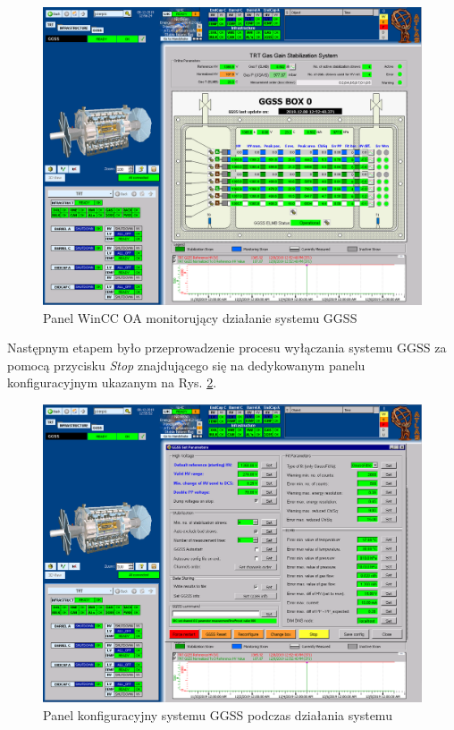 \begin{figure}[H]
\centering
\caption{Panel WinCC OA monitorujący działanie systemu GGSS}
\label{fig:ggss}
\includegraphics[width=\textwidth]{res/png/ggssStraw}
\end{figure}

Następnym etapem było przeprowadzenie procesu wyłączania systemu GGSS za pomocą przycisku \textit{Stop} znajdującego się na dedykowanym panelu konfiguracyjnym ukazanym na Rys. \ref{fig:ggsspanel}. 

\begin{figure}
\centering
\caption{Panel konfiguracyjny systemu GGSS podczas działania systemu}
\label{fig:ggsspanel}
\includegraphics[width=\textwidth]{res/png/ggssConfig}
\end{figure}

